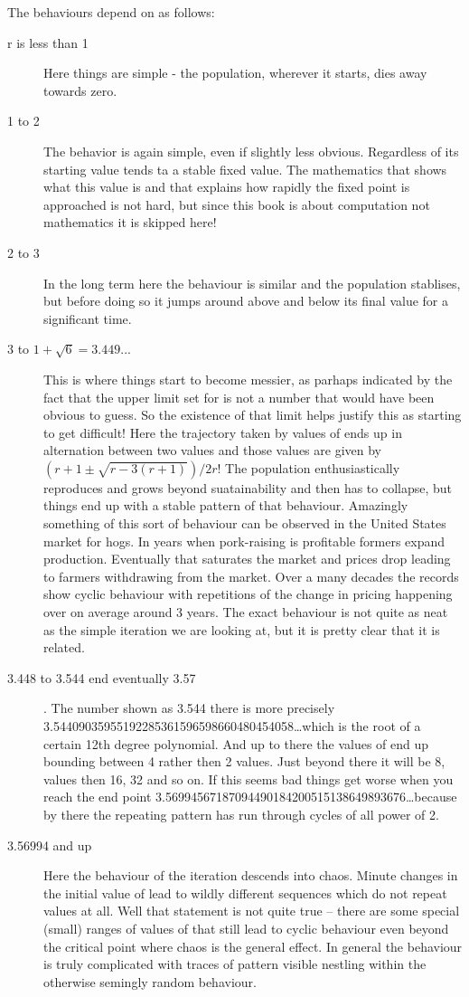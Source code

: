 The behaviours depend on \verb@r@ as follows:
\begin{description}
\item[r is less than 1] Here things are simple - the population, wherever it
starts, dies away towards zero.
\item[1 to 2] The behavior is again simple, even if slightly less obvious.
Regardless of its starting value \verb@x@ tends ta a stable fixed
value. The mathematics that shows what this value is and that explains
how rapidly the fixed point is approached is not hard, but since this
book is about computation not mathematics it is skipped here!
\item[2 to 3] In the long term here the behaviour is similar and the
population stablises, but before doing so it jumps around above and
below its final value for a significant time.
\item[3 to $1+\sqrt 6 = 3.449...$] This is where things start to become
messier, as parhaps indicated by the fact that the upper limit set for
\verb@r@ is not a number that would have been obvious to guess. So the
existence of that limit helps justify this as starting to get difficult!
Here the trajectory taken by values of \verb@x@ ends up in alternation
between two values and those values are given by
$(r + 1 \pm \sqrt{{r-3}(r+1)})/{2 r}$!
The population enthusiastically reproduces and grows beyond suatainability
and then has to collapse, but things end up with a stable pattern of that
behaviour. Amazingly something of this sort of behaviour can be observed in
the United States market for hogs. In years when pork-raising is profitable
formers expand production. Eventually that saturates the market and prices
drop leading to farmers withdrawing from the market. Over a many decades the
records show cyclic behaviour with repetitions of the change in pricing
happening over on average around 3 years. The exact behaviour is not quite
as neat as the simple iteration we are looking at, but it is pretty clear
that it is related.
\item[3.448 to 3.544 end eventually 3.57]. The number shown as 3.544 there is
more precisely
3.54409035955192285361596598660480454058\ldots  which is
the root of a certain 12th degree polynomial. And up to there the values
of \verb@x@ end up bounding between 4 rather then 2 values. Just
beyond there it will be 8, values then 16, 32 and so on. If this seems
bad things get worse when you reach the end point
3.56994567187094490184200515138649893676\ldots because by there the
repeating pattern has run through cycles of all power of 2.
\item[3.56994 and up] Here the behaviour of the iteration descends into
chaos. Minute changes in the initial value of \verb@x@ lead to wildly
different sequences which do not repeat values at all. Well that statement
is not quite true -- there are some special (small) ranges of values
of \verb@r@ that still lead to cyclic behaviour even beyond the critical
point where chaos is the general effect. In general the behaviour is
truly complicated with traces of pattern visible nestling within the
otherwise semingly random behaviour. 
\end{description}
